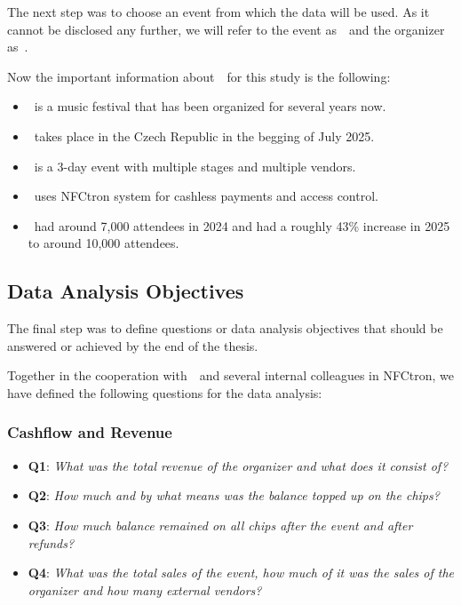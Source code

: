 The next step was to choose an event from which the data will be used.
As it cannot be disclosed any further, we will refer to the event as~\theEvent~and the organizer as~\theOrganizer.

Now the important information about~\theEvent~for this study is the following:
\begin{itemize}
	\item \theEvent~is a music festival that has been organized for several years now.
	\item \theEvent~takes place in the Czech Republic in the begging of July 2025.
	\item \theEvent~is a 3-day event with multiple stages and multiple vendors.
	\item \theEvent~uses NFCtron system for cashless payments and access control.
	\item \theEvent~had around 7,000 attendees in 2024 and had a roughly 43\% increase in 2025 to around 10,000 attendees.
\end{itemize}

\subsection*{Data Analysis Objectives}
\label{subsec:introduction-objectives-data-analysis}

The final step was to define questions or data analysis objectives that should be answered or achieved by the end of the thesis.

Together in the cooperation with~\theOrganizer~and several internal colleagues in NFCtron, we have defined the following questions for the data analysis:

\subsubsection*{Cashflow and Revenue}
\begin{itemize}
	\item \textbf{Q1}: \textit{What was the total revenue of the organizer and what does it consist of?}
	\item \textbf{Q2}: \textit{How much and by what means was the balance topped up on the chips?}
	\item \textbf{Q3}: \textit{How much balance remained on all chips after the event and after refunds?}
	\item \textbf{Q4}: \textit{What was the total sales of the event, how much of it was the sales of the organizer and how many external vendors?}
\end{itemize}

